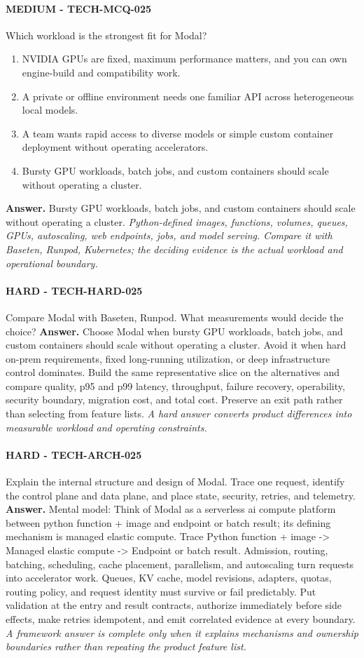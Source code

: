 \paragraph{MEDIUM - TECH-MCQ-025} Which workload is the strongest fit for Modal?
\begin{enumerate}[label=\Alph*.]
\item NVIDIA GPUs are fixed, maximum performance matters, and you can own engine-build and compatibility work.
\item A private or offline environment needs one familiar API across heterogeneous local models.
\item A team wants rapid access to diverse models or simple custom container deployment without operating accelerators.
\item Bursty GPU workloads, batch jobs, and custom containers should scale without operating a cluster.
\end{enumerate}
\textbf{Answer.} Bursty GPU workloads, batch jobs, and custom containers should scale without operating a cluster.
\textit{Python-defined images, functions, volumes, queues, GPUs, autoscaling, web endpoints, jobs, and model serving. Compare it with Baseten, Runpod, Kubernetes; the deciding evidence is the actual workload and operational boundary.}
\paragraph{HARD - TECH-HARD-025} Compare Modal with Baseten, Runpod. What measurements would decide the choice?
\textbf{Answer.} Choose Modal when bursty GPU workloads, batch jobs, and custom containers should scale without operating a cluster. Avoid it when hard on-prem requirements, fixed long-running utilization, or deep infrastructure control dominates. Build the same representative slice on the alternatives and compare quality, p95 and p99 latency, throughput, failure recovery, operability, security boundary, migration cost, and total cost. Preserve an exit path rather than selecting from feature lists.
\textit{A hard answer converts product differences into measurable workload and operating constraints.}
\paragraph{HARD - TECH-ARCH-025} Explain the internal structure and design of Modal. Trace one request, identify the control plane and data plane, and place state, security, retries, and telemetry.
\textbf{Answer.} Mental model: Think of Modal as a serverless ai compute platform between python function + image and endpoint or batch result; its defining mechanism is managed elastic compute. Trace Python function + image -> Managed elastic compute -> Endpoint or batch result. Admission, routing, batching, scheduling, cache placement, parallelism, and autoscaling turn requests into accelerator work. Queues, KV cache, model revisions, adapters, quotas, routing policy, and request identity must survive or fail predictably. Put validation at the entry and result contracts, authorize immediately before side effects, make retries idempotent, and emit correlated evidence at every boundary.
\textit{A framework answer is complete only when it explains mechanisms and ownership boundaries rather than repeating the product feature list.}
